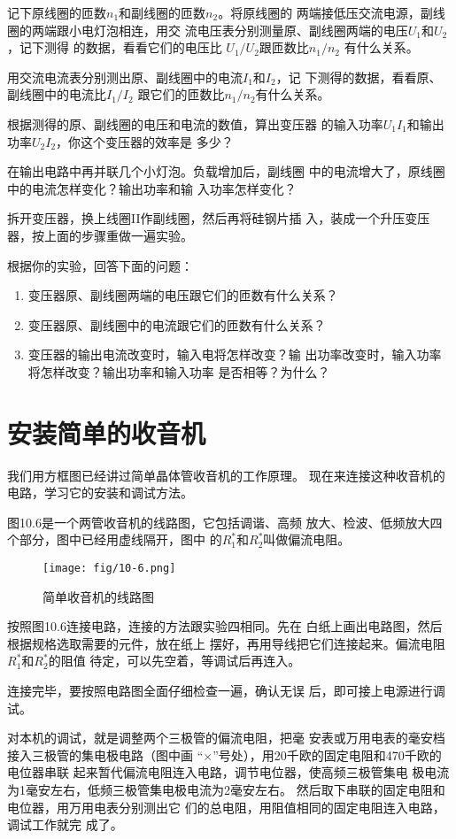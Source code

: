 记下原线圈的匝数$n_1$和副线圈的匝数$n_2$。将原线圈的
两端接低压交流电源，副线圈的两端跟小电灯泡相连，用交
流电压表分别测量原、副线圈两端的电压$U_1$和$U_2$，记下测得
的数据，看看它们的电压比
$U_1/U_2$跟匝数比$n_1/n_2$
有什么关系。

用交流电流表分别测出原、副线圈中的电流$I_1$和$I_2$，记
下测得的数据，看看原、副线圈中的电流比$I_1/I_2$
跟它们的匝数比$n_1/n_2$有什么关系。

根据测得的原、副线圈的电压和电流的数值，算出变压器
的输入功率$U_1I_1$和输出功率$U_2I_2$，你这个变压器的效率是
多少？

在输出电路中再并联几个小灯泡。负载增加后，副线圈
中的电流增大了，原线圈中的电流怎样变化？输出功率和输
入功率怎样变化？

拆开变压器，换上线圈II作副线圈，然后再将硅钢片插
入，装成一个升压变压器，按上面的步骤重做一遍实验。

根据你的实验，回答下面的问题：
\begin{enumerate}
    \item 变压器原、副线圈两端的电压跟它们的匝数有什么关系？
    \item 变压器原、副线圈中的电流跟它们的匝数有什么关系？
    \item 变压器的输出电流改变时，输入电将怎样改变？输
出功率改变时，输入功率将怎样改变？输出功率和输入功率
是否相等？为什么？
\end{enumerate}

\section{安装简单的收音机}
我们用方框图已经讲过简单晶体管收音机的工作原理。
现在来连接这种收音机的电路，学习它的安装和调试方法。

图10.6是一个两管收音机的线路图，它包括调谐、高频
放大、检波、低频放大四个部分，图中已经用虚线隔开，图中
的$R_1^*$和$R_2^*$叫做偏流电阻。
\begin{figure}[htp]\centering
    \texttt{[image: fig/10-6.png]}
    \caption{简单收音机的线路图}
    \end{figure}

按照图10.6连接电路，连接的方法跟实验四相同。先在
白纸上画出电路图，然后根据规格选取需要的元件，放在纸上
摆好，再用导线把它们连接起来。偏流电阻$R_1^*$和$R_2^*$的阻值
待定，可以先空着，等调试后再连入。

连接完毕，要按照电路图全面仔细检查一遍，确认无误
后，即可接上电源进行调试。

对本机的调试，就是调整两个三极管的偏流电阻，把毫
安表或万用电表的毫安档接入三极管的集电极电路（图中画
“$\times$”号处），用20千欧的固定电阻和470千欧的电位器串联
起来暂代偏流电阻连入电路，调节电位器，使高频三极管集电
极电流为1毫安左右，低频三极管集电极电流为2毫安左右。
然后取下串联的固定电阻和电位器，用万用电表分别测出它
们的总电阻，用阻值相同的固定电阻连入电路，调试工作就完
成了。

